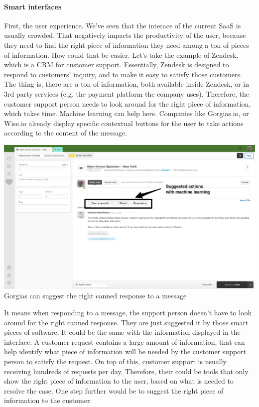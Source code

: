 \documentclass[12pt]{article}
\begin{document}
\paragraph{Smart interfaces}

First, the user experience. We've seen that the interace of the current SaaS is
usually crowded. That negatively impacts the productivity of the user, because
they need to find the right piece of information they need among a ton of pieces
of information. How could that be easier. Let's take the example of Zendesk,
which is a CRM for customer support. Essentially, Zendesk is designed to respond
to customers' inquiry, and to make it easy to satisfy those customers. The thing
is, there are a ton of information, both available inside Zendesk, or in 3rd party
services (e.g. the payment platform the company uses). Therefore, the customer
support person needs to look around for the right piece of information, which
takes time. Machine learning can help here. Companies like Gorgias.io, or Wise.io
already display specific contextual buttons for the user to take actions according
to the content of the message.

\smallskip
\includegraphics[width=\textwidth]{zendesk}
Gorgias can suggest the right canned response to a message
\smallskip

It means when responding to a message, the support person doesn't have to look
around for the right canned response. They are just suggested it by those smart
pieces of software.
It could be the same with the information displayed in the interface. A customer
request contains a large amount of information, that can help identify what piece
of information will be needed by the customer support person to satisfy the
request. On top of this, customer support is usually receiving hundreds of requests
per day. Therefore, their could be tools that only show the right piece of
information to the user, based on what is needed to resolve the case. One step
further would be to suggest the right piece of information to the customer.
\end{document}
